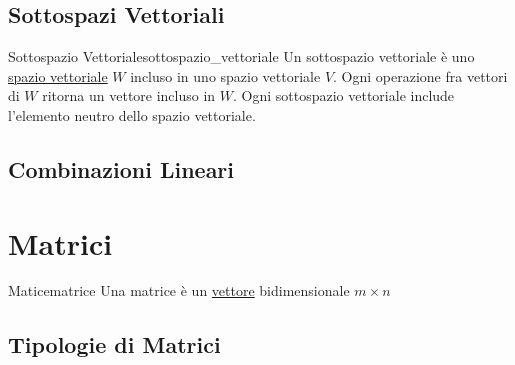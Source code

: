\documentclass{article}
\begin{document}
\subsection{Sottospazi Vettoriali}

\begin{definition}{Sottospazio Vettoriale}{sottospazio_vettoriale}
    Un sottospazio vettoriale è uno \hyperlink{def:spazio_vettoriale}{spazio vettoriale} $W$ incluso in uno spazio vettoriale $V$. Ogni operazione fra vettori di $W$ ritorna un vettore incluso in $W$. Ogni sottospazio vettoriale include l'elemento neutro dello spazio vettoriale.
\end{definition}

\subsection{Combinazioni Lineari}

\section{Matrici}

\begin{definition}{Matice}{matrice}
    Una matrice è un \hyperlink{def:vettore}{vettore} bidimensionale $m \times n$
\end{definition}

\subsection{Tipologie di Matrici}
\end{document}
